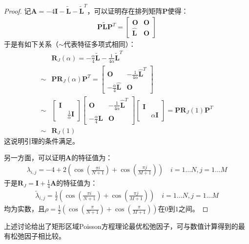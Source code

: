 \documentclass[12pt, a4paper]{article}
\begin{document}
\begin{proof}
记$\mathbf{A}=-4\mathbf{I}-\widetilde{\mathbf{L}}-\widetilde{\mathbf{L}}^T$，可以证明存在排列矩阵$\mathbf{P}$使得：
\begin{align}
    \mathbf{P}\widetilde{\mathbf{L}}\mathbf{P}^T = 
    \left[
    \begin{array}{cc}
    \mathbf{O} & \mathbf{O}\\
    \widehat{\mathbf{L}} & \mathbf{O}
    \end{array}
    \right]
\end{align}
于是有如下关系（$\sim$代表特征多项式相同）：
\begin{align}
        &\mathbf{R}_J(\alpha)=-\frac{\alpha}{4}\widetilde{\mathbf{L}}-\frac{1}{4\alpha}\widetilde{\mathbf{L}}^T\\ 
    \sim&\mathbf{P}\mathbf{R}_J(\alpha)\mathbf{P}^T=
    \left[
        \begin{array}{cc}
        \mathbf{O} & -\frac{1}{4\alpha}\widehat{\mathbf{L}}^T\\
        -\frac{\alpha}{4}\widehat{\mathbf{L}} & \mathbf{O}
        \end{array}
    \right]\\   
    \sim&\left[
        \begin{array}{cc}
        \mathbf{I} & \\
         & \frac{1}{\alpha}\mathbf{I}
        \end{array}
    \right]
    \left[
        \begin{array}{cc}
        \mathbf{O} & -\frac{1}{4\alpha}\widehat{\mathbf{L}}^T\\
        -\frac{\alpha}{4}\widehat{\mathbf{L}} & \mathbf{O}
        \end{array}
    \right]
    \left[
        \begin{array}{cc}
        \mathbf{I} & \\
         & \alpha\mathbf{I}
        \end{array}
    \right]=
    \mathbf{P}\mathbf{R}_J(1)\mathbf{P}^T\\
    \sim&\mathbf{R}_J(1)
\end{align} 
这说明引理的条件满足。

另一方面，可以证明$\mathbf{A}$的特征值为：
\begin{align}
    \lambda_{i,j} = -4 + 2(\cos(\frac{\pi i}{N+1})+\cos(\frac{\pi j}{M+1}))\quad i=1\dots N, j=1\dots M
\end{align}
于是$\mathbf{R}_J=\mathbf{I}+\frac{1}{4}\mathbf{A}$的特征值为：
\begin{align}
    \widetilde{\lambda}_{i,j} = \frac{1}{2}(\cos(\frac{\pi i}{N+1})+\cos(\frac{\pi j}{M+1}))\quad i=1\dots N, j=1\dots M
\end{align}
均为实数，且$\rho=\frac{1}{2}(\cos(\frac{\pi}{N+1})+\cos(\frac{\pi}{M+1}))$在$0$到$1$之间。
\end{proof}
上述讨论给出了矩形区域Poisson方程理论最优松弛因子，可与数值计算得到的最有松弛因子相比较。
\end{document}
